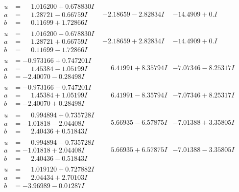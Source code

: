 \documentclass[1p]{elsarticle_modified}
\theoremstyle{definition}
\begin{document}
$$\begin{array}{c|c|c}
\begin{aligned}
u &= \phantom{-}1.016200 + 0.678830 I \\
a &= \phantom{-}1.28721 - 0.66759 I \\
b &= \phantom{-}0.11699 + 1.72866 I\end{aligned}
 & -2.18659 - 2.82834 I & -14.4909 + 0. I\phantom{ +0.000000I} \\ \hline\begin{aligned}
u &= \phantom{-}1.016200 - 0.678830 I \\
a &= \phantom{-}1.28721 + 0.66759 I \\
b &= \phantom{-}0.11699 - 1.72866 I\end{aligned}
 & -2.18659 + 2.82834 I & -14.4909 + 0. I\phantom{ +0.000000I} \\ \hline\begin{aligned}
u &= -0.973166 + 0.747201 I \\
a &= \phantom{-}1.45384 - 1.05199 I \\
b &= -2.40070 - 0.28498 I\end{aligned}
 & \phantom{-}6.41991 + 8.35794 I & -7.07346 - 8.25317 I \\ \hline\begin{aligned}
u &= -0.973166 - 0.747201 I \\
a &= \phantom{-}1.45384 + 1.05199 I \\
b &= -2.40070 + 0.28498 I\end{aligned}
 & \phantom{-}6.41991 - 8.35794 I & -7.07346 + 8.25317 I \\ \hline\begin{aligned}
u &= \phantom{-}0.994894 + 0.735728 I \\
a &= -1.01818 - 2.04408 I \\
b &= \phantom{-}2.40436 + 0.51843 I\end{aligned}
 & \phantom{-}5.66935 - 6.57875 I & -7.01388 + 3.35805 I \\ \hline\begin{aligned}
u &= \phantom{-}0.994894 - 0.735728 I \\
a &= -1.01818 + 2.04408 I \\
b &= \phantom{-}2.40436 - 0.51843 I\end{aligned}
 & \phantom{-}5.66935 + 6.57875 I & -7.01388 - 3.35805 I \\ \hline\begin{aligned}
u &= \phantom{-}1.019120 + 0.727882 I \\
a &= \phantom{-}2.04434 + 2.70103 I \\
b &= -3.96989 - 0.01287 I\end{aligned}

\end{array}$$
\end{document}

